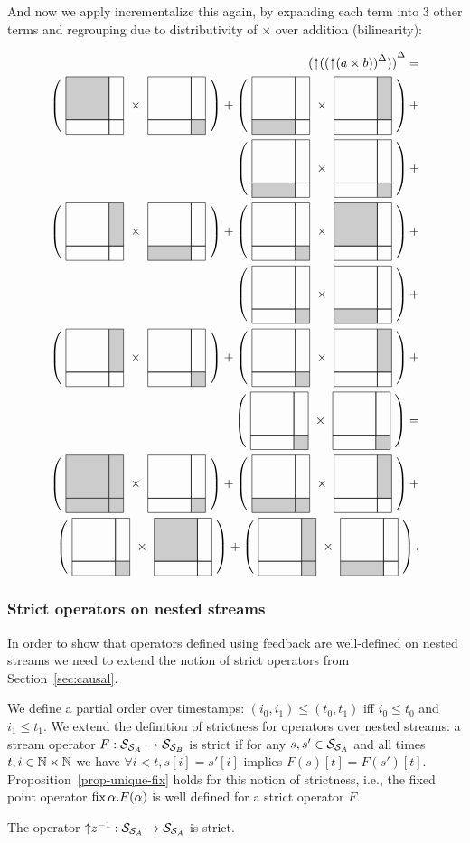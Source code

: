 And now we apply incrementalize this again, by expanding each
term into 3 other terms and regrouping due to distributivity of $\times$ over addition (bilinearity):

$$
\begin{aligned}
\inc{(\lift{(\inc{(\lift{(a \times b)})})})} = \\ 
%
\matmult{\mtrx{1 0 0 0}}{\mtrx{0 0 0 1}} + 
\matmult{\mtrx{0 0 1 0}}{\mtrx{0 1 0 0}} + \\
\matmult{\mtrx{0 0 1 0}}{\mtrx{0 0 0 1}} + \\ 
%
\matmult{\mtrx{0 1 0 0}}{\mtrx{0 0 1 0}} +
\matmult{\mtrx{0 0 0 1}}{\mtrx{1 0 0 0}} +\\
\matmult{\mtrx{0 0 0 1}}{\mtrx{0 0 1 0}} +\\
%
\matmult{\mtrx{0 1 0 0}}{\mtrx{0 0 0 1}} +
\matmult{\mtrx{0 0 0 1}}{\mtrx{0 1 0 0}} + \\
\matmult{\mtrx{0 0 0 1}}{\mtrx{0 0 0 1}} = \\
%
\matmult{\mtrx{1 1 1 1}}{\mtrx{0 0 0 1}} + 
\matmult{\mtrx{0 0 1 1}}{\mtrx{0 1 0 0}} + \\
\matmult{\mtrx{0 0 0 1}}{\mtrx{1 0 0 0}} + 
\matmult{\mtrx{0 1 0 1}}{\mtrx{0 0 1 9}}.
\end{aligned}
$$

\subsubsection{Strict operators on nested streams}

In order to show that operators defined using feedback are well-defined on
nested streams we need to extend the notion of strict operators from Section~\ref{sec:causal}.

We define a partial order over timestamps: $(i_0, i_1)
\leq (t_0, t_1)$ iff $i_0 \leq t_0$ and $i_1 \leq t_1$.  We extend the
definition of strictness for operators over nested streams: a stream operator
$F: \mathcal{S}_{\mathcal{S}_{A}} \to \mathcal{S}_{\mathcal{S}_{B}}$ is strict if for any $s, s' \in
\mathcal{S}_{\mathcal{S}_{A}}$ and all times $t, i \in \mathbb{N} \times \mathbb{N}$ we have $\forall i <
t, s[i] = s'[i]$ implies $F(s)[t] = F(s')[t]$.
Proposition~\ref{prop-unique-fix} holds for this notion of strictness, i.e., the fixed point operator $\mbox{fix}\,\alpha.F(\alpha)$ is well defined for a strict operator $F$.

\begin{proposition}\label{prop-liftz}
The operator ${\uparrow}z^{-1}: \mathcal{S}_{\mathcal{S}_{A}} \to \mathcal{S}_{\mathcal{S}_{A}}$ is strict.
\end{proposition}

